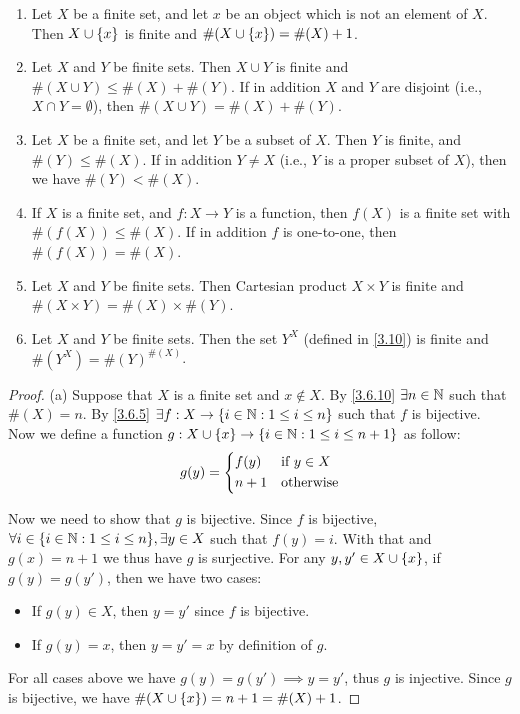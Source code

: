 \begin{prop}\label{3.6.14}
	\leavevmode
	\begin{enumerate}
		\item Let \(X\) be a finite set, and let \(x\) be an object which is not an element of \(X\).
		      Then \(X \cup \left\lbrace x\right\rbrace\) is finite and \(\#(X \cup \left\lbrace x\right\rbrace) = \#(X) + 1\).
		\item Let \(X\) and \(Y\) be finite sets.
		      Then \(X \cup Y\) is finite and \(\#(X \cup Y) \leq \#(X) + \#(Y)\).
		      If in addition \(X\) and \(Y\) are disjoint (i.e., \(X \cap Y = \emptyset\)), then \(\#(X \cup Y) = \#(X) + \#(Y)\).
		\item Let \(X\) be a finite set, and let \(Y\) be a subset of \(X\).
		      Then \(Y\) is finite, and \(\#(Y) \leq \#(X)\).
		      If in addition \(Y \neq X\) (i.e., \(Y\) is a proper subset of \(X\)), then we have \(\#(Y) < \#(X)\).
		\item If \(X\) is a finite set, and \(f : X \to Y\) is a function, then \(f(X)\) is a finite set with \(\#(f(X)) \leq \#(X)\).
		      If in addition \(f\) is one-to-one, then \(\#(f(X)) = \#(X)\).
		\item Let \(X\) and \(Y\) be finite sets.
		      Then Cartesian product \(X \times Y\) is finite and \(\#(X \times Y) = \#(X) \times \#(Y)\).
		\item Let \(X\) and \(Y\) be finite sets.
		      Then the set \(Y^X\) (defined in \cref{3.10}) is finite and \(\#(Y^X) = \#(Y)^{\#(X)}\).
	\end{enumerate}
\end{prop}

\begin{proof}{(a)}
	Suppose that \(X\) is a finite set and \(x \notin X\).
	By \cref{3.6.10} \(\exists n \in \mathbb{N}\) such that \(\#(X) = n\).
	By \cref{3.6.5} \(\exists f : X \to \left\lbrace i \in \mathbb{N} : 1 \leq i \leq n\right\rbrace\) such that \(f\) is bijective.
	Now we define a function \(g : X \cup \left\lbrace x\right\rbrace \to \left\lbrace i \in \mathbb{N} : 1 \leq i \leq n + 1\right\rbrace\) as follow:
	\[
		g(y) = \begin{dcases}
			f(y)  & \text{if } y \in X \\
			n + 1 & \text{otherwise}
		\end{dcases}
	\]

	Now we need to show that \(g\) is bijective.
	Since \(f\) is bijective, \(\forall i \in \set{i \in \N : 1 \leq i \leq n}, \exists y \in X\) such that \(f(y) = i\).
	With that and \(g(x) = n + 1\) we thus have \(g\) is surjective.
	For any \(y, y' \in X \cup \left\lbrace x\right\rbrace\), if \(g(y) = g(y')\), then we have two cases:
	\begin{itemize}
		\item If \(g(y) \in X\), then \(y = y'\) since \(f\) is bijective.
		\item If \(g(y) = x\), then \(y = y' = x\) by definition of \(g\).
	\end{itemize}
	For all cases above we have \(g(y) = g(y') \implies y = y'\), thus \(g\) is injective.
	Since \(g\) is bijective, we have \(\#(X \cup \left\lbrace x\right\rbrace) = n + 1 = \#(X) + 1\).
\end{proof}


